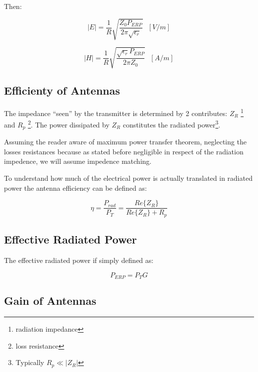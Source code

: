 Then:

\begin{equation}
	|E| = \frac{1}{R} \sqrt{\frac{Z_0 P_{ERP}}{2\pi \sqrt{\epsilon_r}}} \ \ \ [V/m]
\end{equation}


\begin{equation}
	|H| = \frac{1}{R} \sqrt{\frac{\sqrt{\epsilon_r} P_{ERP}}{2\pi Z_0}} \ \ \ [A/m]
\end{equation}


\subsection{Efficienty of Antennas} %
\label{sub:efficienty_of_antennas}

The impedance “seen” by the transmitter is determined by 2 contributes: $Z_R$ \footnote{radiation impedance} and $R_p$ \footnote{loss resistance}. The power dissipated by $Z_R$ constitutes the radiated power\footnote{Typically $R_p \ll |Z_R|$}.

Assuming the reader aware of maximum power transfer theorem, neglecting the losses resistances because as stated before negligible in respect of the radiation impedence, we will assume impedence matching.

To understand how much of the electrical power is actually translated in radiated power the antenna efficiency can be defined as:

\begin{equation}
  	\eta = \frac{P_{rad}}{P_T}= \frac{Re\{ Z_R \}}{Re\{ Z_R \}+R_p}
  \end{equation}  


\subsection{Effective Radiated Power} %
\label{sub:effective_radiated_power}

The effective radiated power if simply defined as:

\begin{equation}
	P_{ERP} = P_TG 
\end{equation}


\subsection{Gain of Antennas} %
\label{sub:gain_of_antenna}

